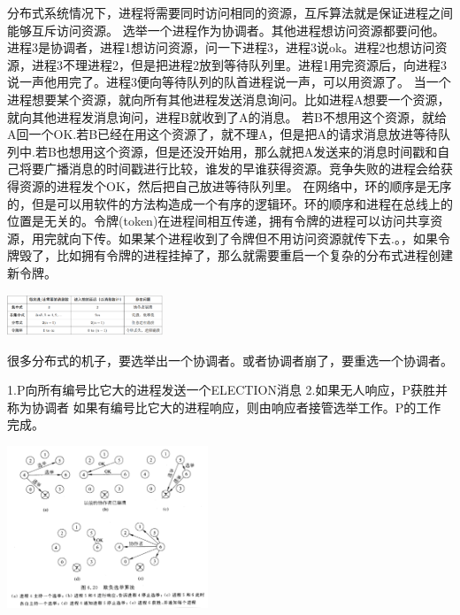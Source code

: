 \documentclass[twoside]{ctexart}
\begin{document}
\begin{multicols}{2}
   分布式系统情况下，进程将需要同时访问相同的资源，互斥算法就是保证进程之间能够互斥访问资源。 选举一个进程作为协调者。其他进程想访问资源都要问他。进程3是协调者，进程1想访问资源，问一下进程3，进程3说ok。进程2也想访问资源，进程3不理进程2，但是把进程2放到等待队列里。进程1用完资源后，向进程3说一声他用完了。进程3便向等待队列的队首进程说一声，可以用资源了。 当一个进程想要某个资源，就向所有其他进程发送消息询问。比如进程A想要一个资源，就向其他进程发消息询问，进程B就收到了A的消息。 若B不想用这个资源，就给A回一个OK.若B已经在用这个资源了，就不理A，但是把A的请求消息放进等待队列中.若B也想用这个资源，但是还没开始用，那么就把A发送来的消息时间戳和自己将要广播消息的时间戳进行比较，谁发的早谁获得资源。竞争失败的进程会给获得资源的进程发个OK，然后把自己放进等待队列里。 在网络中，环的顺序是无序的，但是可以用软件的方法构造成一个有序的逻辑环。环的顺序和进程在总线上的位置是无关的。令牌(token)在进程间相互传递，拥有令牌的进程可以访问共享资源，用完就向下传。如果某个进程收到了令牌但不用访问资源就传下去.。，如果令牌毁了，比如拥有令牌的进程挂掉了，那么就需要重启一个复杂的分布式进程创建新令牌。

  
\includegraphics[width=0.35\textwidth,keepaspectratio]{pics/mutex_table.png}

   很多分布式的机子，要选举出一个协调者。或者协调者崩了，要重选一个协调者。 
  
       1.P向所有编号比它大的进程发送一个ELECTION消息  2.如果无人响应，P获胜并称为协调者  如果有编号比它大的进程响应，则由响应者接管选举工作。P的工作完成。

\includegraphics[width=0.45\textwidth,keepaspectratio]{pics/bully.png}


\end{multicols}
\end{document}
